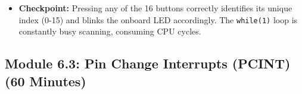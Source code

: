 \documentclass[11pt,a4paper]{article}
\begin{document}
\begin{itemize}
\begin{lstlisting}[caption={Code for Module 6.2: Polling Keypad Scanner}]
            // Check all rows
            for (int r = 0; r < 4; r++) {
                // If a row pin is now LOW, a button is pressed
                if (!(ROW_PINS & (1 << r))) {
                    key_pressed = (r * 4) + c;
                    // Simple debounce and wait for release
                    _delay_ms(50);
                    while(!(ROW_PINS & (1 << r)));
                    goto found; // Break out of both loops
                }
            }
            // Restore the column to HIGH before moving to the next
            COL_PORT |= (1 << c);
        }

    found:
        if (key_pressed != -1) {
            // Blink the LED 'key_pressed' number of times
            for(int i=0; i <= key_pressed; i++) {
                PORTB |= (1 << PB5); _delay_ms(100);
                PORTB &= ~(1 << PB5); _delay_ms(100);
            }
        }
    }
    return 0;
}
\end{lstlisting}
    \item \textbf{Checkpoint:} Pressing any of the 16 buttons correctly identifies its unique index (0-15) and blinks the onboard LED accordingly. The \verb|while(1)| loop is constantly busy scanning, consuming CPU cycles.
\end{itemize}
\newpage
\subsection*{Module 6.3: Pin Change Interrupts (PCINT) (60 Minutes)}
\end{document}
